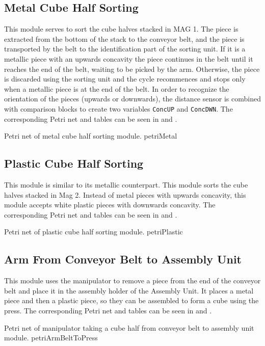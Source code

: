 \subsection{Metal Cube Half Sorting}
This module serves to sort the cube halves stacked in MAG 1. The piece is
extracted from the bottom of the stack to the conveyor belt, and the piece is
transported by the belt to the identification part of the sorting unit. If it is
a metallic
piece with an upwards concavity the piece continues in the belt until it
reaches the end of the belt, waiting to be picked by the arm. Otherwise, the piece is
discarded using the sorting unit and the cycle recommences and stops only when
a metallic piece is at the end of the belt.
In order to recognize the orientation of the pieces (upwards or downwards), the
distance sensor is combined with comparison blocks to create two variables
\verb|ConcUP| and \verb|ConcDWN|.
The corresponding Petri net and tables can be seen in
 and .


{Petri net of metal cube half sorting module.}
{petriMetal}
\subsection{Plastic Cube Half Sorting}
This module is similar to its metallic counterpart. This module sorts the cube
halves stacked in Mag 2. Instead of metal pieces with upwards concavity, this
module accepts white plastic pieces with downwards concavity.
The corresponding Petri net and tables can be seen in
 and .


{Petri net of plastic cube half sorting module.}
{petriPlastic}

\subsection{Arm From Conveyor Belt to Assembly Unit}
This module uses the manipulator to remove a piece from the end of the
conveyor belt and place it in the assembly holder of the Assembly Unit. It places
a metal piece
and then a plastic piece, so they can be assembled to form a cube using the press.
The corresponding Petri net and tables can be seen in
 and .

\pagebreak

{Petri net of manipulator taking a cube half from conveyor belt to assembly unit
  module.}
{petriArmBeltToPress}
